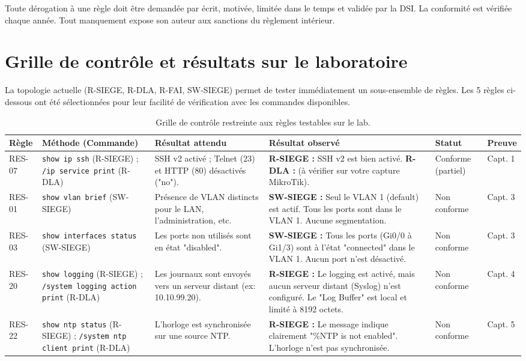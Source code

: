 \documentclass[11pt,a4paper]{article}
\begin{document}
	Toute dérogation à une règle doit être demandée par écrit, motivée, limitée dans le temps et validée par la DSI. La conformité est vérifiée chaque année. Tout manquement expose son auteur aux sanctions du règlement intérieur.
	
	\section{Grille de contrôle et résultats sur le laboratoire}
	
	La topologie actuelle (R-SIEGE, R-DLA, R-FAI, SW-SIEGE) permet de tester immédiatement un sous-ensemble de règles. Les 5 règles ci-dessous ont été sélectionnées pour leur facilité de vérification avec les commandes disponibles.
	
		\scriptsize
	\begin{longtable}{p{0.85cm} p{3.65cm} p{3.0cm} p{3.2cm} p{1.4cm} p{1.2cm}}
		\caption{Grille de contrôle restreinte aux règles testables sur le lab.}\\
		\hline
		\textbf{Règle} & \textbf{Méthode (Commande)} & \textbf{Résultat attendu} & \textbf{Résultat observé} & \textbf{Statut} & \textbf{Preuve}\\
		\hline
		\endhead
		RES-07 & \texttt{show ip ssh} (R-SIEGE) ; \texttt{/ip service print} (R-DLA) & SSH v2 activé ; Telnet (23) et HTTP (80) désactivés ("no"). & \textbf{R-SIEGE :} SSH v2 est bien activé. \textbf{R-DLA :} (à vérifier sur votre capture MikroTik). & Conforme (partiel) & Capt. 1\\
		\hline
		RES-01 & \texttt{show vlan brief} (SW-SIEGE) & Présence de VLAN distincts pour le LAN, l'administration, etc. & \textbf{SW-SIEGE :} Seul le VLAN 1 (default) est actif. Tous les ports sont dans le VLAN 1. Aucune segmentation. & Non conforme & Capt. 3\\
		\hline
		RES-03 & \texttt{show interfaces status} (SW-SIEGE) & Les ports non utilisés sont en état "disabled". & \textbf{SW-SIEGE :} Tous les ports (Gi0/0 à Gi1/3) sont à l'état "connected" dans le VLAN 1. Aucun port n'est désactivé. & Non conforme & Capt. 3\\
		\hline
		RES-20 & \texttt{show logging} (R-SIEGE) ; \texttt{/system logging action print} (R-DLA) & Les journaux sont envoyés vers un serveur distant (ex: 10.10.99.20). & \textbf{R-SIEGE :} Le logging est activé, mais aucun serveur distant (Syslog) n'est configuré. Le "Log Buffer" est local et limité à 8192 octets. & Non conforme & Capt. 4\\
		\hline
		RES-22 & \texttt{show ntp status} (R-SIEGE) ; \texttt{/system ntp client print} (R-DLA) & L'horloge est synchronisée sur une source NTP. & \textbf{R-SIEGE :} Le message indique clairement "\%NTP is not enabled". L'horloge n'est pas synchronisée. & Non conforme & Capt. 5\\
		\hline
	\end{longtable}
	\normalsize
	
\end{document}
